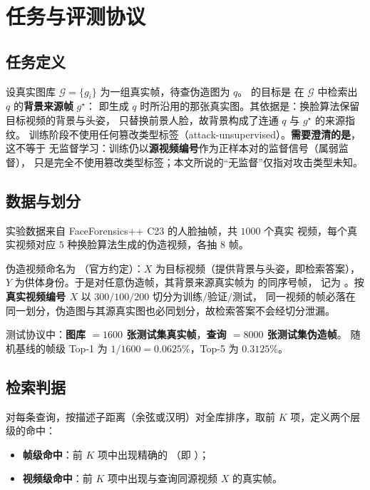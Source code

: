 \section{任务与评测协议}
\label{sec:task}

\subsection{任务定义}

设真实图库 $\mathcal{G}=\{g_i\}$ 为一组真实帧，待查伪造图为 $q$。\aura{} 的目标是
在 $\mathcal{G}$ 中检索出 $q$ 的\textbf{背景来源帧} $g^\star$：
即生成 $q$ 时所沿用的那张真实图。其依据是：换脸算法保留目标视频的背景与头姿，
只替换前景人脸，故背景构成了连通 $q$ 与 $g^\star$ 的来源指纹。
训练阶段不使用任何篡改类型标签（attack-unsupervised）。\textbf{需要澄清的是}，这不等于
无监督学习：训练仍以\textbf{源视频编号}作为正样本对的监督信号（属弱监督），
只是完全不使用篡改类型标签；本文所说的“无监督”仅指对攻击类型未知。

\subsection{数据与划分}

实验数据来自 FaceForensics++ C23\cite{rossler2019faceforensics} 的人脸抽帧，共 $1000$ 个真实
视频，每个真实视频对应 $5$ 种换脸算法生成的伪造视频，各抽 $8$ 帧。

伪造视频命名为 （官方约定）：$X$ 为目标视频（提供背景与头姿，即检索答案），
$Y$ 为供体身份。于是对任意伪造帧，其背景来源真实帧为  的同序号帧，
记为 \sourceid{}。按\textbf{真实视频编号 $X$} 以 $300/100/200$ 切分为训练$/$验证$/$测试，
同一视频的帧必落在同一划分，伪造图与其源真实图也必同划分，故检索答案不会经切分泄漏。

测试协议中：\textbf{图库 $=1600$ 张测试集真实帧}，\textbf{查询 $=8000$ 张测试集伪造帧}。
随机基线的帧级 Top-1 为 $1/1600=0.0625\%$，Top-5 为 $0.3125\%$。

\subsection{检索判据}

对每条查询，按描述子距离（余弦或汉明）对全库排序，取前 $K$ 项，定义两个层级的命中：

\begin{itemize}[leftmargin=1.4em,itemsep=1pt]
\item \textbf{帧级命中}：前 $K$ 项中出现精确的 \sourceid{}（即 ）；
\item \textbf{视频级命中}：前 $K$ 项中出现与查询同源视频 $X$ 的真实帧。
\end{itemize}


